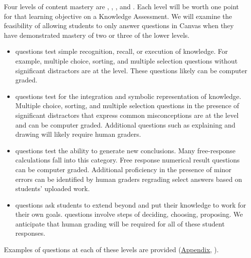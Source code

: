 \documentclass[10pt,letterpaper]{article}
\begin{document}

 Four levels of content mastery are \recall, \comprehension, \analysis, and \use. Each level will be worth one point for that learning objective on a Knowledge Assessment. We will examine the feasibility of allowing students to only answer \use questions in Canvas when they have demonstrated mastery of two or three of the lower levels. 

\begin{itemize}
\item \Recall questions test simple recognition, recall, or execution of knowledge. For example, multiple choice, sorting, and multiple selection questions without significant distractors are at the \recall level. These questions likely can be computer graded. %

\item \Comprehension questions test for the integration and symbolic representation of knowledge. Multiple choice, sorting, and multiple selection questions in the presence of significant distractors that express common misconceptions are at the \comprehension level and can be computer graded. Additional questions such as explaining and drawing will likely require human graders.  

\item \Analysis questions test the ability to generate new conclusions. Many free-response calculations fall into this category. Free response numerical result questions can be computer graded. Additional proficiency in the presence of minor errors can be identified by human graders regrading select answers based on students' uploaded work.

\item \Use questions ask students to extend beyond \analysis and put their knowledge to work for their own goals. \Use questions involve steps of deciding, choosing, proposing. We anticipate that human grading will be required for all of these student responses.
\end{itemize}
Examples of questions at each of these levels are provided (\hyperref[app:example_questions]{Appendix}, ).
%
\end{document}

